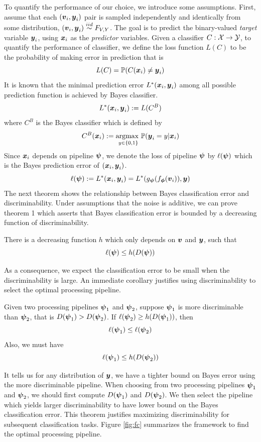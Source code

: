 \documentclass{article}
\begin{document}
To quantify the performance of our choice, we introduce some assumptions.  First, assume that each $(\boldsymbol{v}_i,\boldsymbol{y}_i)$ pair is sampled independently and identically from some distribution, $(\boldsymbol{v}_i,\boldsymbol{y}_i) \overset{iid}{\sim} F_{V,Y}$. The goal is to predict the binary-valued \emph{target} variable $\boldsymbol{y}_i$,  using $\boldsymbol{x}_i$ as the \emph{predictor} variables. Given a classifier $C: \mathcal{X} \rightarrow \mathcal{Y}$, to quantify the performance of classifier, we define the loss function $L(C)$ to be the probability of making error in prediction that is
\[L(C) = \mathbb{P}(C(\boldsymbol{x}_i) \neq \boldsymbol{y}_i) \]
It is known that the minimal prediction error $L^*(\boldsymbol{x}_i,\boldsymbol{y}_i)$ among all possible prediction function is achieved by Bayes classifier.
\[L^*(\boldsymbol{x}_i,\boldsymbol{y}_i) : = L(C^B)\]
where $C^{B}$ is the Bayes classifier which is defined by
\[C^{B}(\boldsymbol{x}_i):= \underset{y \in \{0,1\} }{\text{argmax }} \mathbb{P}(\boldsymbol{y}_i=y|\boldsymbol{x}_i)\] 
Since $\boldsymbol{x}_i$ depends on pipeline $\boldsymbol{\psi}$, we denote the loss of pipeline $\boldsymbol{\psi}$ by $\ell(\boldsymbol{\psi})$ which is the Bayes prediction error of $(\boldsymbol{x}_i, \boldsymbol{y}_i)$.
\[\ell(\boldsymbol{\psi}):= L^*(\boldsymbol{x}_i,\boldsymbol{y}_i) = L^*(g_{\boldsymbol{\psi}} (f_{\boldsymbol{\phi}} (\boldsymbol{v}_i) ),\boldsymbol{y}) \] 
The next theorem shows the relationship between Bayes classification error and discriminability. Under assumptions that the noise is additive, we can prove theorem 1 which asserts that Bayes classification error is bounded by a decreasing function of discriminability. 
\begin{thm}	
	There is a decreasing function $h$ which only depends on $\boldsymbol{v}$ and $\boldsymbol{y}$, such that
	\[\ell(\boldsymbol{\psi}) \leq h(D(\boldsymbol{\psi})) \]
\end{thm}
As a consequence, we expect the classification error to be small when the discriminability is large. An immediate corollary justifies using discriminability to select the optimal processing pipeline. 
\begin{coro}	
	Given two processing pipelines $\boldsymbol{\psi}_1$ and $\boldsymbol{\psi}_2$, suppose $\boldsymbol{\psi}_1$ is more discriminable than $\boldsymbol{\psi}_2$, that is $D(\boldsymbol{\psi}_1) > D(\boldsymbol{\psi}_2)$. If $\ell(\boldsymbol{\psi}_2) \geq h(D(\boldsymbol{\psi}_1))$, then
	\[ \ell(\boldsymbol{\psi}_1) \leq \ell(\boldsymbol{\psi}_2) \] 
	Also, we must have
	\[ \ell(\boldsymbol{\psi}_1) \leq h(D(\boldsymbol{\psi}_2)) \]
	
\end{coro}
It tells us for any distribution of $\boldsymbol{y}$, we have a tighter bound on Bayes error using the more discriminable pipeline. When choosing from two processing pipelines $\boldsymbol{\psi}_1$ and $\boldsymbol{\psi}_2$, we should first compute $D(\boldsymbol{\psi}_1)$ and $D(\boldsymbol{\psi}_2)$. We then select the pipeline which yields larger discriminability to have lower bound on the Bayes classification error. This theorem justifies maximizing discriminability for subsequent classification tasks. Figure \ref{fig:fc} summarizes the framework to find the optimal processing pipeline. 
\end{document}

